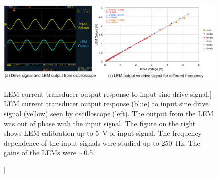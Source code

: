 \begin{singlespace}
\begin{figure}[!h]
	\begin{center}
	\includegraphics[width=15.0cm]{figures/BModLEMCalibration}
	\end{center}
	\caption
	[LEM current transducer output response to input sine drive signal.]
	{LEM current transducer output response (blue) to input sine drive signal (yellow) seen by oscilloscope (left). The output from the LEM was out of phase with the input signal. The figure on the right shows LEM calibration up to 5~V of input signal. The frequency dependence of the input signals were studied up to 250~Hz. The gains of the LEMs were $\sim$0.5.}
	\label{fig:BModLEMCalibration}
\end{figure}
\end{singlespace}


